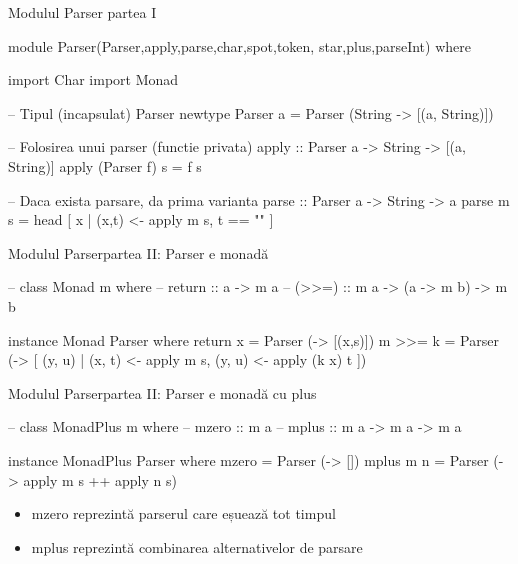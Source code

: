 \documentclass[xcolor=pdftex,romanian,colorlinks]{beamer}
\begin{document}
\begin{frame}[fragile]{Modulul Parser}
{partea I}
\begin{asciihs}
  module Parser(Parser,apply,parse,char,spot,token,
    star,plus,parseInt) where

  import Char
  import Monad

  -- Tipul (incapsulat) Parser
  newtype Parser a = Parser (String -> [(a, String)])

  -- Folosirea unui parser (functie privata)
  apply :: Parser a -> String -> [(a, String)]
  apply (Parser f) s = f s

  -- Daca exista parsare, da prima varianta
  parse :: Parser a -> String -> a
  parse m s = head [ x | (x,t) <- apply m s, t == "" ]
\end{asciihs}
\end{frame}



\begin{frame}[fragile]{Modulul Parser}{partea II: Parser e monadă}
\begin{asciihs}

  --   class Monad m where
  --     return :: a -> m a
  --     (>>=) :: m a -> (a -> m b) -> m b

  instance Monad Parser where
    return x  = Parser (\s -> [(x,s)])
    m >>= k   = Parser (\s ->
                   [ (y, u) |
                     (x, t) <- apply m s,
                     (y, u) <- apply (k x) t ])
\end{asciihs}
\end{frame}



\begin{frame}[fragile]{Modulul Parser}{partea II: Parser e monadă cu plus}
\begin{asciihs}
  --   class MonadPlus m where
  --     mzero :: m a
  --     mplus :: m a -> m a -> m a

  instance MonadPlus Parser where
    mzero      = Parser (\s -> [])
    mplus m n  = Parser (\s -> apply m s ++ apply n s)
\end{asciihs}

\begin{itemize}
\item mzero reprezintă parserul care eșuează tot timpul
\item mplus reprezintă combinarea alternativelor de parsare
\end{itemize}

\end{frame}
\end{document}
